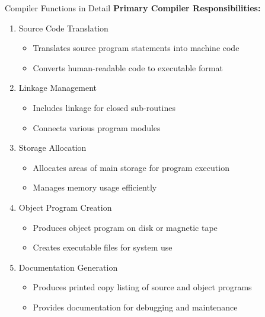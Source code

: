 \documentclass[aspectratio=169]{beamer}
\begin{document}
\begin{frame}{Compiler Functions in Detail}
    \textbf{Primary Compiler Responsibilities:}
    
    \begin{enumerate}
        \item Source Code Translation
        \begin{itemize}
            \item Translates source program statements into machine code
            \item Converts human-readable code to executable format
        \end{itemize}
        
        \item Linkage Management
        \begin{itemize}
            \item Includes linkage for closed sub-routines
            \item Connects various program modules
        \end{itemize}
        
        \item Storage Allocation
        \begin{itemize}
            \item Allocates areas of main storage for program execution
            \item Manages memory usage efficiently
        \end{itemize}
        
        \item Object Program Creation
        \begin{itemize}
            \item Produces object program on disk or magnetic tape
            \item Creates executable files for system use
        \end{itemize}
        
        \item Documentation Generation
        \begin{itemize}
            \item Produces printed copy listing of source and object programs
            \item Provides documentation for debugging and maintenance
        \end{itemize}
    \end{enumerate}
\end{frame}
\end{document}
